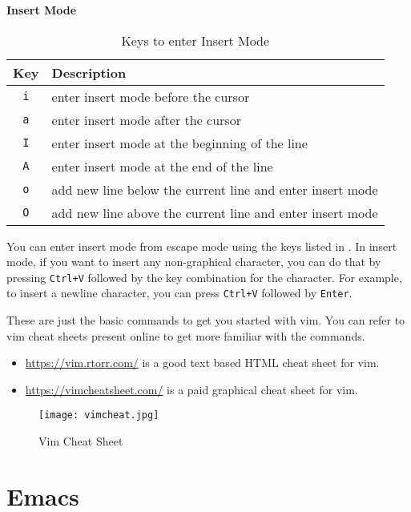 \textbf{Insert Mode}

\begin{table*}[h!]
  \caption{Keys to enter Insert Mode}
  \begin{tabular}{c l}
    \toprule
    Key & Description \\
    \midrule
    \lstinline|i| & enter insert mode before the cursor \\
    \lstinline|a| & enter insert mode after the cursor \\
    \lstinline|I| & enter insert mode at the beginning of the line \\
    \lstinline|A| & enter insert mode at the end of the line \\
    \lstinline|o| & add new line below the current line and enter insert mode \\
    \lstinline|O| & add new line above the current line and enter insert mode \\
    \bottomrule
  \end{tabular}
\end{table*}

You can enter insert mode from escape mode using the
keys listed in .
In insert mode, if you want to insert any non-graphical character,
you can do that by pressing \lstinline|Ctrl+V| followed by the
key combination for the character. For example, to insert
a newline character, you can press \lstinline|Ctrl+V| followed
by \lstinline|Enter|.

These are just the basic commands to get you started with vim.
You can refer to vim cheat sheets present online to get
more familiar with the commands.

\begin{itemize}
  \item \url{https://vim.rtorr.com/} is a good text based HTML cheat sheet for vim.
  \item \url{https://vimcheatsheet.com/} is a paid graphical cheat sheet for vim.
\end{itemize}

\begin{figure*}[p]
  \texttt{[image: vimcheat.jpg]}
  \caption{Vim Cheat Sheet}
\end{figure*}

\vfill
\pagebreak
\section{Emacs}

